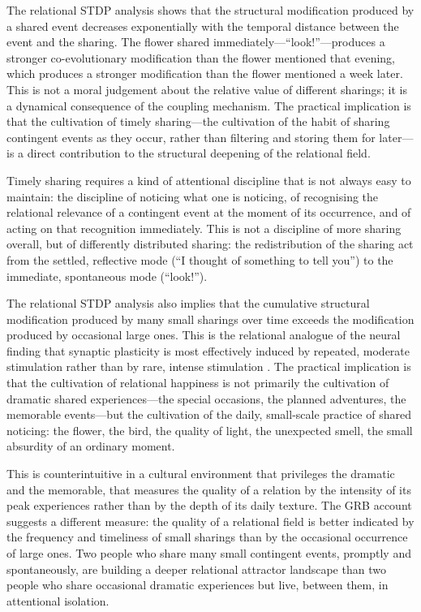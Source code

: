  The relational STDP analysis shows that the structural modification produced by a shared event decreases exponentially with the temporal distance between the event and the sharing. The flower shared immediately---``look!''---produces a stronger co-evolutionary modification than the flower mentioned that evening, which produces a stronger modification than the flower mentioned a week later. This is not a moral judgement about the relative value of different sharings; it is a dynamical consequence of the coupling mechanism. The practical implication is that the cultivation of timely sharing---the cultivation of the habit of sharing contingent events as they occur, rather than filtering and storing them for later---is a direct contribution to the structural deepening of the relational field.

Timely sharing requires a kind of attentional discipline that is not always easy to maintain: the discipline of noticing what one is noticing, of recognising the relational relevance of a contingent event at the moment of its occurrence, and of acting on that recognition immediately. This is not a discipline of more sharing overall, but of differently distributed sharing: the redistribution of the sharing act from the settled, reflective mode (``I thought of something to tell you'') to the immediate, spontaneous mode (``look!'').

 The relational STDP analysis also implies that the cumulative structural modification produced by many small sharings over time exceeds the modification produced by occasional large ones. This is the relational analogue of the neural finding that synaptic plasticity is most effectively induced by repeated, moderate stimulation rather than by rare, intense stimulation \parencite{bi1998}. The practical implication is that the cultivation of relational happiness is not primarily the cultivation of dramatic shared experiences---the special occasions, the planned adventures, the memorable events---but the cultivation of the daily, small-scale practice of shared noticing: the flower, the bird, the quality of light, the unexpected smell, the small absurdity of an ordinary moment.

This is counterintuitive in a cultural environment that privileges the dramatic and the memorable, that measures the quality of a relation by the intensity of its peak experiences rather than by the depth of its daily texture. The GRB account suggests a different measure: the quality of a relational field is better indicated by the frequency and timeliness of small sharings than by the occasional occurrence of large ones. Two people who share many small contingent events, promptly and spontaneously, are building a deeper relational attractor landscape than two people who share occasional dramatic experiences but live, between them, in attentional isolation.

